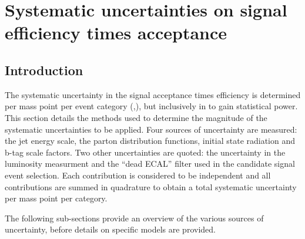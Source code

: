 \clearpage
\section{Systematic uncertainties on signal efficiency times 
  acceptance\label{sec:sms-syst}}

\subsection{Introduction} 

The systematic uncertainty in the signal acceptance times efficiency
is determined per mass point per event category (\njet,\nb), but inclusively
in \scalht to gain statistical power. This section details the methods 
used to determine the magnitude of the systematic uncertainties to be applied. 
Four sources of uncertainty are measured: the jet energy scale,
the parton distribution functions, initial state radiation and b-tag scale
factors. Two other uncertainties are quoted: the uncertainty in the luminosity
measurment and the ``dead ECAL'' filter used in the candidate signal
event selection. Each contribution is considered to be independent 
and all contributions are summed in quadrature to obtain a total 
systematic uncertainty per mass point per category.

The following sub-sections provide an overview of the various sources of
uncertainty, before details on specific models are provided. 
%
%
%
%
